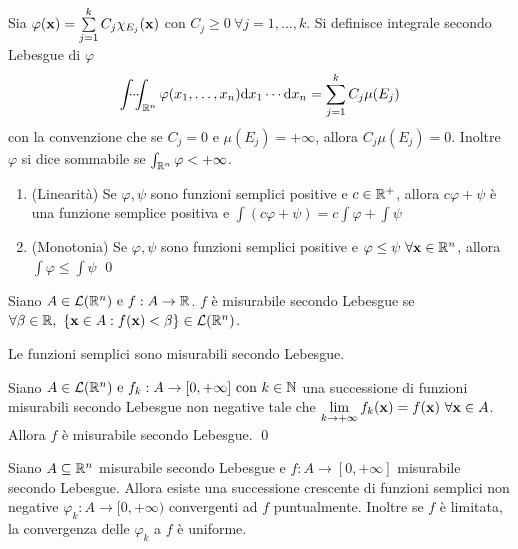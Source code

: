 \begin{definition}
	Sia $\varphi(\vb{x})=\sum\limits_{j=1}^k C_j \chi_{E_j}(\vb{x})$ con $C_j \geq 0 \ \forall j=1,\dots,k$. Si definisce integrale secondo Lebesgue di $\varphi$
	$$
		\idotsint_{\mathbb{R}^n}\varphi(x_1,\dots,x_n)\dd x_1 \cdots \dd x_n = \sum_{j=1}^kC_j\mu(E_j)
	$$
	con la convenzione che se $C_j=0$ e $\mu(E_j)=+\infty$, allora $C_j\mu(E_j)=0$.
	Inoltre $\varphi$ si dice sommabile se $\int_{\mathbb{R}^n} \varphi < + \infty$.
\end{definition}

\begin{theorem}
	\leavevmode
	\begin{enumerate}
		\item (Linearità) Se $\varphi,\psi$ sono funzioni semplici positive e $c\in \mathbb{R}^+$, allora $c\varphi + \psi$ è una funzione semplice positiva e $\int(c\varphi + \psi)=c\int\varphi +\int\psi$
		\item (Monotonia) Se $\varphi, \psi$ sono funzioni semplici positive e $\varphi \leq \psi \ \forall \vb{x} \in \mathbb{R}^n$, allora  $\int \varphi \leq \int \psi$
		\qed
	\end{enumerate}
\end{theorem}

\begin{definition}
	Siano $A \in \mathcal{L}(\mathbb{R}^n) \text{ e } f:A\to \mathbb{R}$. $f$ è misurabile secondo Lebesgue se $\forall \beta \in \mathbb{R}, \ \{\vb{x}\in A:f(\vb{x})<\beta\} \in \mathcal{L}(\mathbb{R}^n)$.
\end{definition}

\begin{remark}
	Le funzioni semplici sono misurabili secondo Lebesgue.
\end{remark}

\begin{theorem}
	Siano $A \in \mathcal{L}(\mathbb{R}^n) \text{ e } f_k:A \to [0,+\infty] \text{ con } k\in \mathbb{N}$ una successione di funzioni misurabili secondo Lebesgue non negative tale che $\lim\limits_{k\to +\infty}f_k(\vb{x})=f(\vb{x}) \ \forall \vb{x} \in A$. Allora $f$ è misurabile secondo Lebesgue.
	\qed
\end{theorem}

\begin{theorem}
	Siano $A \subseteq \mathbb{R}^n$ misurabile secondo Lebesgue e $f:A\to [0,+\infty]$ misurabile secondo Lebesgue. Allora esiste una successione crescente di funzioni semplici non negative $\varphi_k:A\to [0,+\infty)$ convergenti ad $f$ puntualmente. Inoltre se $f$ è limitata, la convergenza delle $\varphi_k$ a $f$ è uniforme.
\end{theorem}

